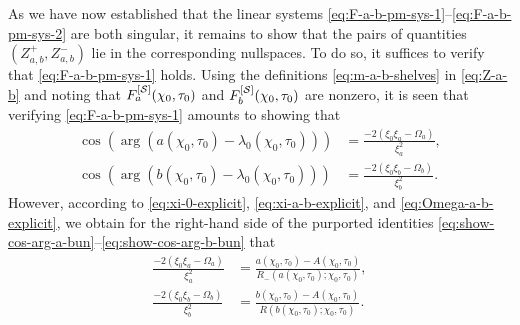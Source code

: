 As we have now established that the linear systems \eqref{eq:F-a-b-pm-sys-1}--\eqref{eq:F-a-b-pm-sys-2}
 are both singular, it remains to show that the pairs of quantities $(Z_{a,b}^{+}, Z_{a,b}^{-})$
lie in the corresponding nullspaces. 
To do so, it suffices to verify that \eqref{eq:F-a-b-pm-sys-1} 
holds. 
Using the definitions \eqref{eq:m-a-b-shelves} in \eqref{eq:Z-a-b}
and noting that $F^{[\mathcal{S}]}_a(\chi_0,\tau_0)$ and $F^{[\mathcal{S}]}_b(\chi_0,\tau_0)$ are nonzero, it is seen that verifying \eqref{eq:F-a-b-pm-sys-1}
amounts to showing that
\begin{align}
\cos( \arg(a(\chi_0,\tau_0)-\lambda_0(\chi_0,\tau_0)) ) &= \frac{-2(\xi_0\xi_a - \Omega_a)}{\xi_a^2},\label{eq:show-cos-arg-a-bun}\\
\cos( \arg(b(\chi_0,\tau_0)-\lambda_0(\chi_0,\tau_0)) ) &= \frac{-2(\xi_0\xi_b - \Omega_b)}{\xi_b^2}.\label{eq:show-cos-arg-b-bun}
\end{align}
However, according to 
\eqref{eq:xi-0-explicit}, \eqref{eq:xi-a-b-explicit}, and \eqref{eq:Omega-a-b-explicit}, we obtain for the right-hand side of the purported identities \eqref{eq:show-cos-arg-a-bun}--\eqref{eq:show-cos-arg-b-bun} that
\begin{align}
\frac{-2(\xi_0\xi_a - \Omega_a)}{\xi_a^2}&=\frac{a(\chi_0,\tau_0) - A(\chi_0,\tau_0)}{R_-(a(\chi_0,\tau_0);\chi_0,\tau_0)},\label{eq:show-cos-arg-a-simp}\\
\frac{-2(\xi_0\xi_b - \Omega_b)}{\xi_b^2}&=\frac{b(\chi_0,\tau_0) - A(\chi_0,\tau_0)}{R(b(\chi_0,\tau_0);\chi_0,\tau_0)}.\label{eq:show-cos-arg-b-simp}
\end{align}
